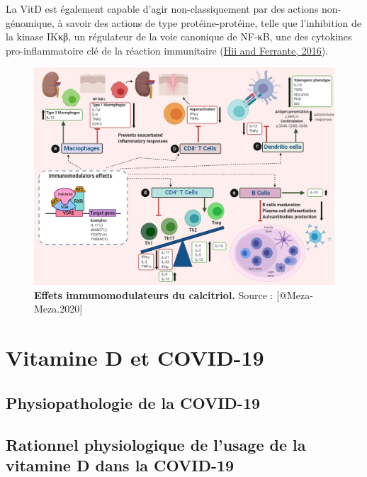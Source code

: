 \documentclass[
  a4paper,
  DIV=11,
  numbers=noendperiod,
  listof=totoc]{scrreprt}
\begin{document}
La VitD est également capable d'agir non-classiquement par des actions
non-génomique, à savoir des actions de type protéine-protéine, telle que
l'inhibition de la kinase IKκβ, un régulateur de la voie canonique de
NF-κB, une des cytokines pro-inflammatoire clé de la réaction
immunitaire (\protect\hyperlink{ref-Hii.2016}{Hii and Ferrante, 2016}).

\begin{figure}
\includegraphics{figures/calcitriol-immunomodulatory.jpg} 
\caption[\textbf{Effets immunomodulateurs du calcitriol.}]{\textbf{Effets immunomodulateurs du calcitriol.} Source : [@Meza-Meza.2020]}\label{fig:immunomod}
\end{figure}

\hypertarget{vitamine-d-et-covid-19}{%
\chapter{Vitamine D et COVID-19}\label{vitamine-d-et-covid-19}}

\hypertarget{physiopathologie-de-la-covid-19}{%
\section{Physiopathologie de la
COVID-19}\label{physiopathologie-de-la-covid-19}}

\hypertarget{rationnel-physiologique-de-lusage-de-la-vitamine-d-dans-la-covid-19}{%
\section{Rationnel physiologique de l'usage de la vitamine D dans la
COVID-19}\label{rationnel-physiologique-de-lusage-de-la-vitamine-d-dans-la-covid-19}}
\end{document}
